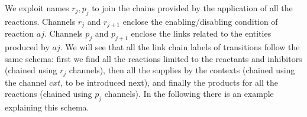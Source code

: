 We exploit names $r_j,p_j$ to join the chains provided by the application of all the reactions. 
Channels $r_j$ and $r_{j+1}$ enclose the enabling/disabling condition of reaction $aj$.
Channels $p_j$ and $p_{j+1}$ enclose the links related to the entities produced by $aj$.
We will see that all the link chain labels of transitions follow the same schema: first we find all the reactions limited to the reactants and inhibitors (chained using $r_j$ channels), then all the supplies by the contexts (chained using the channel $\mathit{cxt}$, to be introduced next), and finally the products for all the reactions (chained using $p_j$ channels). 
In the following there is an example explaining this schema.

